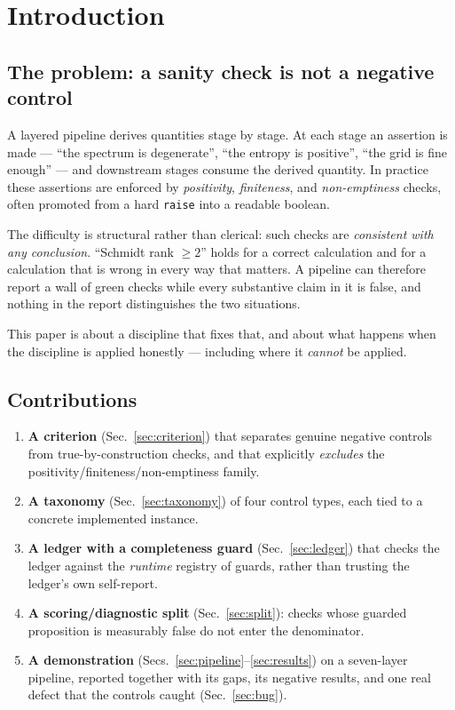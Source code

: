 \documentclass[11pt,a4paper]{article}
\newcommand{\code}[1]{\texttt{\small #1}}
\begin{document}
\section{Introduction}
\label{sec:intro}

\subsection{The problem: a sanity check is not a negative control}

A layered pipeline derives quantities stage by stage. At each stage an assertion is
made --- ``the spectrum is degenerate'', ``the entropy is positive'', ``the grid is
fine enough'' --- and downstream stages consume the derived quantity. In practice
these assertions are enforced by \emph{positivity}, \emph{finiteness}, and
\emph{non-emptiness} checks, often promoted from a hard \code{raise} into a
readable boolean.

The difficulty is structural rather than clerical: such checks are \emph{consistent
with any conclusion}. ``Schmidt rank $\ge 2$'' holds for a correct calculation and
for a calculation that is wrong in every way that matters. A pipeline can therefore
report a wall of green checks while every substantive claim in it is false, and
nothing in the report distinguishes the two situations.

This paper is about a discipline that fixes that, and about what happens when the
discipline is applied honestly --- including where it \emph{cannot} be applied.

\subsection{Contributions}

\begin{enumerate}[leftmargin=1.4em,itemsep=2pt]
  \item \textbf{A criterion} (Sec.~\ref{sec:criterion}) that separates genuine
        negative controls from true-by-construction checks, and that explicitly
        \emph{excludes} the positivity/finiteness/non-emptiness family.
  \item \textbf{A taxonomy} (Sec.~\ref{sec:taxonomy}) of four control types, each
        tied to a concrete implemented instance.
  \item \textbf{A ledger with a completeness guard} (Sec.~\ref{sec:ledger}) that
        checks the ledger against the \emph{runtime} registry of guards, rather
        than trusting the ledger's own self-report.
  \item \textbf{A scoring/diagnostic split} (Sec.~\ref{sec:split}): checks whose
        guarded proposition is measurably false do not enter the denominator.
  \item \textbf{A demonstration} (Secs.~\ref{sec:pipeline}--\ref{sec:results}) on a
        seven-layer pipeline, reported together with its gaps, its negative
        results, and one real defect that the controls caught
        (Sec.~\ref{sec:bug}).
\end{enumerate}
\end{document}

